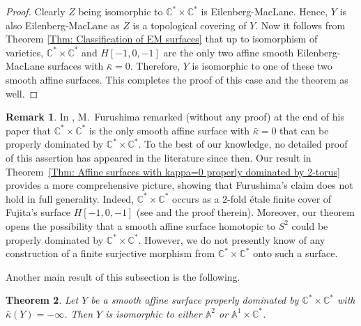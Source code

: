 \documentclass[12pt,reqno,twoside]{amsart}
\newtheorem{theorem}{Theorem}[section]
\theoremstyle{definition}
\newtheorem{remark}[theorem]{Remark}
\numberwithin{equation}{section}
\newcommand{\A}{\mathbb{A}}
\newcommand{\C}{\mathbb{C}}
\newcommand{\Kbar}{\bar{\kappa}}
\begin{document}
\begin{proof}
    Clearly $Z$ being isomorphic to $\C^* \times \C^*$ is Eilenberg-MacLane. Hence, $Y$ is also Eilenberg-MacLane as $Z$ is a topological covering of $Y$. Now it follows from Theorem \ref{Thm: Classification of EM surfaces} that up to isomorphism of varieties, $\C^* \times \C^*$ and $H[-1,0,-1]$ are the only two affine smooth Eilenberg-MacLane surfaces with $\Kbar = 0$. Therefore, $Y$ is isomorphic to one of these two smooth affine surfaces. This completes the proof of this case and the theorem as well.
\end{proof}

\begin{remark}
In \cite{Fur1989}, M.~Furushima remarked (without any proof) at the end of his paper that $\C^* \times \C^*$ is the only smooth affine surface with $\Kbar = 0$ that can be properly dominated by $\C^* \times \C^*$. To the best of our knowledge, no detailed proof of this assertion has appeared in the literature since then. Our result in Theorem~\ref{Thm: Affine surfaces with kappa=0 properly dominated by 2-torus} provides a more comprehensive picture, showing that Furushima’s claim does not hold in full generality. Indeed, $\C^* \times \C^*$ occurs as a $2$-fold {\'e}tale finite cover of Fujita’s surface $H[-1,0,-1]$ (see \cite[Proposition~5.8]{GGH2023} and the proof therein). Moreover, our theorem opens the possibility that a smooth affine surface homotopic to $S^2$ could be properly dominated by $\C^* \times \C^*$. However, we do not presently know of any construction of a finite surjective morphism from $\C^* \times \C^*$ onto such a surface.
\end{remark}

\medskip

Another main result of this subsection is the following.

\begin{theorem}\label{Thm: Affine surfaces with kappa negative properly dominated by 2-torus}
   Let $Y$ be a smooth affine surface properly dominated by $\C^*\times \C^*$ with $\Kbar(Y)=-\infty$. Then $Y$ is isomorphic to either $\A^2$ or $\A^1\times \C^*$.
\end{theorem}
\end{document}
